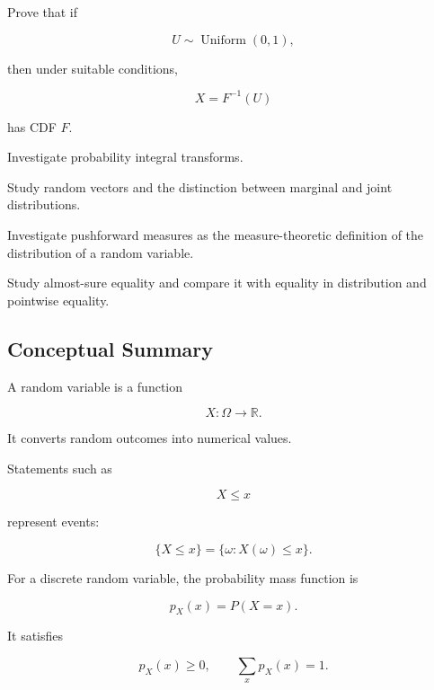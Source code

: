 \begin{exercise}[4]
Prove that if

\[
U\sim\operatorname{Uniform}(0,1),
\]

then under suitable conditions,

\[
X=F^{-1}(U)
\]

has CDF \(F\).
\end{exercise}

\begin{exercise}[4]
Investigate probability integral transforms.
\end{exercise}

\begin{exercise}[4]
Study random vectors and the distinction between marginal and joint
distributions.
\end{exercise}

\begin{exercise}[4]
Investigate pushforward measures as the measure-theoretic definition of
the distribution of a random variable.
\end{exercise}

\begin{exercise}[4]
Study almost-sure equality and compare it with equality in distribution
and pointwise equality.
\end{exercise}

\subsection{Conceptual Summary}
\label{subsec:random-variable-summary}

A random variable is a function

\[
\boxed{
X:\Omega\to\mathbb{R}.
}
\]

It converts random outcomes into numerical values.

Statements such as

\[
X\leq x
\]

represent events:

\[
\boxed{
\{X\leq x\}
=
\{\omega:X(\omega)\leq x\}.
}
\]

For a discrete random variable, the probability mass function is

\[
\boxed{
p_X(x)=P(X=x).
}
\]

It satisfies

\[
\boxed{
p_X(x)\geq0,
\qquad
\sum_xp_X(x)=1.
}
\]

